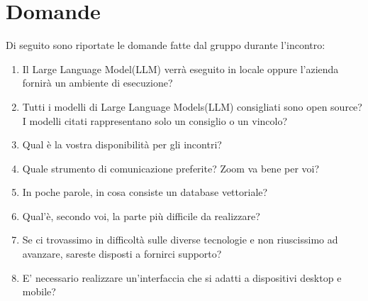 \documentclass[a4paper, 12pt]{article}
\begin{document}
\section{Domande}
Di seguito sono riportate le domande fatte dal gruppo durante l'incontro:
\begin{enumerate}
    \item Il Large Language Model(LLM) verrà eseguito in locale oppure l'azienda fornirà un ambiente di esecuzione?
    \item Tutti i modelli di Large Language Models(LLM) consigliati sono open source? I modelli citati rappresentano solo un consiglio o un vincolo?
    \item Qual è la vostra disponibilità per gli incontri?
    \item Quale strumento di comunicazione preferite? Zoom va bene per voi?
    \item In poche parole, in cosa consiste un database vettoriale?
    \item Qual'è, secondo voi, la parte più difficile da realizzare?
    \item Se ci trovassimo in difficoltà sulle diverse tecnologie e non riuscissimo ad avanzare, sareste disposti a fornirci supporto?
    \item E' necessario realizzare un'interfaccia che si adatti a dispositivi desktop e mobile?
\end{enumerate}
\end{document}
